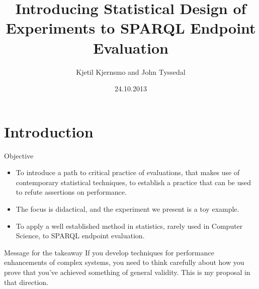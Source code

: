 \documentclass[english,usenames,dvipsnames,aspectratio=169]{beamer}
\begin{document}
\title[DoE in SPARQL Evaluations]{Introducing Statistical Design of Experiments to SPARQL Endpoint Evaluation}
\subtitle{}
\author{Kjetil Kjernsmo and John Tyssedal}
\date{24.10.2013}
\maketitle

\section{Introduction} 

\begin{frame}{Objective}
  \begin{itemize}
  \item To introduce a path to critical practice of evaluations, that makes
use of contemporary statistical techniques, to establish a practice
that can be used to refute assertions on performance.
\item The focus is didactical, and the experiment we present is a toy
example.
\item To apply a well established method in statistics, rarely used in
  Computer Science, to SPARQL endpoint evaluation.

  \end{itemize}

  \begin{block}{Message for the takeaway}
    If you develop techniques for performance enhancements of complex
    systems, you need to think carefully about how you prove that 
    you've achieved something of general validity. This is my proposal
    in that direction.
  \end{block}

\end{frame}
\end{document}
